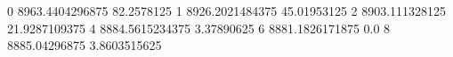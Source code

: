 0 8963.4404296875 82.2578125
1 8926.2021484375 45.01953125
2 8903.111328125 21.9287109375
4 8884.5615234375 3.37890625
6 8881.1826171875 0.0
8 8885.04296875 3.8603515625
